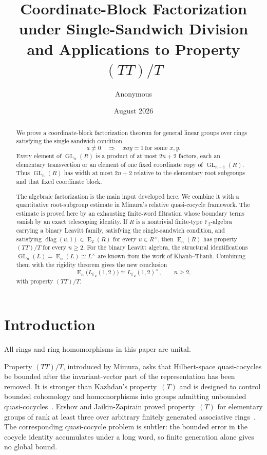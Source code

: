 \documentclass[11pt]{amsart}
\title[Coordinate-block factorization and \texorpdfstring{\((TT)/T\)}{(TT)/T}]
{Coordinate-Block Factorization under Single-Sandwich Division
and Applications to Property \texorpdfstring{\((TT)/T\)}{(TT)/T}}
\author{Anonymous}
\date{August 2026}
\theoremstyle{definition}
\theoremstyle{plain}
\newcommand{\F}{\mathbb F}
\newcommand{\GL}{\operatorname{GL}}
\newcommand{\EL}{\operatorname{E}}
\newcommand{\diag}{\operatorname{diag}}
\begin{document}
\begin{abstract}
We prove a coordinate-block factorization theorem for general linear
groups over rings satisfying the single-sandwich condition
\[
  a\ne0\quad\Longrightarrow\quad
  xay=1\ \text{for some }x,y.
\]
Every element of \(\GL_n(R)\) is a product of at most \(2n+2\)
factors, each an elementary transvection or an element of one fixed
coordinate copy of \(\GL_{n-1}(R)\).  Thus \(\GL_n(R)\) has width at
most \(2n+2\) relative to the elementary root subgroups and that
fixed coordinate block.

The algebraic factorization is the main input developed here.  We
combine it with a quantitative root-subgroup estimate in Mimura's
relative quasi-cocycle framework.  The estimate is proved here by an
exhausting finite-word filtration whose boundary terms vanish by an
exact telescoping identity.  If \(R\) is a nontrivial finite-type
\(\F_2\)-algebra carrying a binary Leavitt family, satisfying the
single-sandwich condition, and satisfying
\(\diag(u,1)\in\EL_2(R)\) for every \(u\in R^\times\), then
\(\EL_n(R)\) has property \((TT)/T\) for every \(n\ge2\).
For the binary Leavitt algebra, the structural identifications
\(\GL_n(L)=\EL_n(L)\cong L^\times\) are known from the work of
Khanh--Thanh.  Combining them with the rigidity theorem gives the new
conclusion
\[
  \EL_n\bigl(L_{\F_2}(1,2)\bigr)
  \cong L_{\F_2}(1,2)^\times,
  \qquad n\ge2,
\]
with property \((TT)/T\).
\end{abstract}

\maketitle

\section{Introduction}\label{sec:introduction}

All rings and ring homomorphisms in this paper are unital.

Property \((TT)/T\), introduced by Mimura, asks that Hilbert-space
quasi-cocycles be bounded after the invariant-vector part of the
representation has been removed.  It is stronger than Kazhdan's
property~\((T)\) and is designed to control bounded cohomology and
homomorphisms into groups admitting unbounded
quasi-cocycles~\cite{MimuraTT}.  Ershov and Jaikin-Zapirain proved property~\((T)\)
for elementary groups of rank at least three over arbitrary finitely
generated associative rings~\cite{ErshovJaikin}.  The corresponding quasi-cocycle problem
is subtler: the bounded error in the cocycle identity accumulates
under a long word, so finite generation alone gives no global bound.
\end{document}
